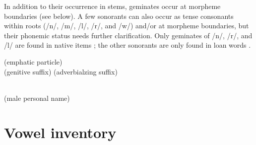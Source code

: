 In addition to their occurrence in stems, geminates occur at morpheme boundaries (see  below). A few sonorants can also occur as tense consonants within roots (/n/, /m/, /l/, /r/, and /w/) and/or at morpheme boundaries, but their phonemic status needs further clarification. Only geminates of /n/, /r/, and /l/ are found in native items ; the other sonorants are only found in loan words .
%
\begin{exe}
	\ex	\label{ex:gemination C1 phon}
	\TabPositions{11em}
		 	 \tab {} (emphatic particle)	\\
		 (genitive suffix)	\tab {} (adverbialzing suffix)	\\
		 	

	\ex	\label{ex:gemination C2 phon}
	\TabPositions{11em}
			 	 \tab 	{} 	\\
			 	 \tab 	{} (male personal name)		
\end{exe}



\section{Vowel inventory}
\label{sec:Vowel inventory}


